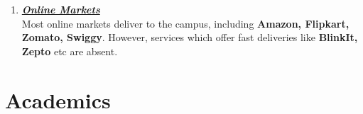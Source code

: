 \documentclass[openany]{book}
\begin{document}
\begin{enumerate}
\begin{itemize}
        Outside campus, there are multiple places to get food and snacks, differing in price ranges and also in types of cuisines offered. 
        \item \textbf{Cycles} \\
        There is a cycle shop just outside gate 7, if you want to buy a cycle to get around within campus. Many people require cycles since the campus is quite large and you will not want to walk everywhere all the time.
        \item \textbf{Clothes and Sports Goods} \\ 
        To shop for clothes, you can go to Kalyani in a rickshaw and shop from there or take the local train to Kanchrapara, which is a hub for cloth markets. You can go to \textbf{Maidan Market} in Kolkata to get things you may need to play sports, such as racquets, jerseys, balls etc. 
        \item \textbf{\textit{Textbooks and Notebooks}} \\ 
        You will probably never need physical copies of textbooks, and everything else, from writing tools to notebooks can be easily found in the basement shops. 
    \end{itemize}
    \item \underline{\textbf{\textit{Online Markets}}} \\
    Most online markets deliver to the campus, including \textbf{Amazon, Flipkart, Zomato, Swiggy}. However, services which offer fast deliveries like \textbf{BlinkIt, Zepto} etc are absent. 
\end{enumerate}
\section{Academics}
\end{document}
